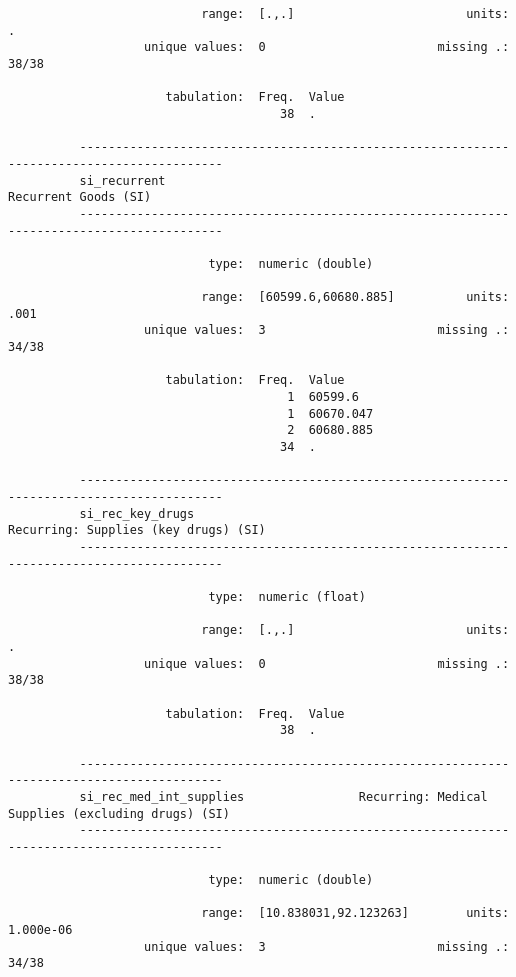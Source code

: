 \documentclass{article}
\begin{document}
\begin{verbatim}
                           range:  [.,.]                        units:  .
                   unique values:  0                        missing .:  38/38
          
                      tabulation:  Freq.  Value
                                      38  .
          
          ------------------------------------------------------------------------------------------
          si_recurrent                                                          Recurrent Goods (SI)
          ------------------------------------------------------------------------------------------
          
                            type:  numeric (double)
          
                           range:  [60599.6,60680.885]          units:  .001
                   unique values:  3                        missing .:  34/38
          
                      tabulation:  Freq.  Value
                                       1  60599.6
                                       1  60670.047
                                       2  60680.885
                                      34  .
          
          ------------------------------------------------------------------------------------------
          si_rec_key_drugs                                      Recurring: Supplies (key drugs) (SI)
          ------------------------------------------------------------------------------------------
          
                            type:  numeric (float)
          
                           range:  [.,.]                        units:  .
                   unique values:  0                        missing .:  38/38
          
                      tabulation:  Freq.  Value
                                      38  .
          
          ------------------------------------------------------------------------------------------
          si_rec_med_int_supplies                Recurring: Medical Supplies (excluding drugs) (SI)
          ------------------------------------------------------------------------------------------
          
                            type:  numeric (double)
          
                           range:  [10.838031,92.123263]        units:  1.000e-06
                   unique values:  3                        missing .:  34/38
          

\end{verbatim}
\end{document}
